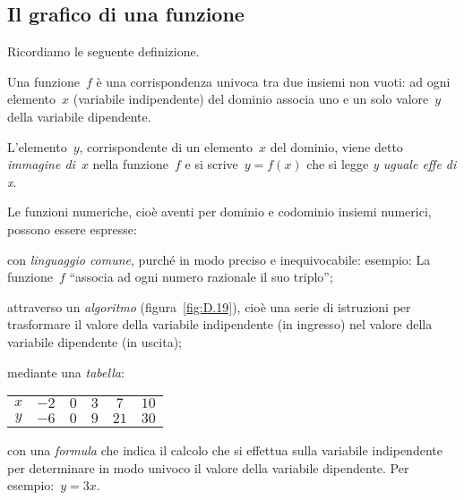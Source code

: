 \begin{comment}
% 
% 
% 
% 


\end{comment}

\subsection{Il grafico di una funzione}
\label{subsec:fun_grafico}

Ricordiamo le seguente definizione.
\begin{definizione}
 Una funzione~\(f\) è una corrispondenza univoca tra due insiemi non vuoti: ad 
ogni elemento~\(x\) (variabile indipendente)
del dominio associa uno e un solo valore~\(y\) della variabile dipendente.

 L'elemento~\(y\), corrispondente di un elemento~\(x\) del dominio, viene detto 
\emph{immagine di}~\(x\) nella funzione~\(f\) e si scrive~\(y=f(x)\) che si legge 
\emph{y uguale effe di x}.
\end{definizione}
Le funzioni numeriche, cioè aventi per dominio e codominio insiemi numerici, 
possono essere espresse:
\begin{itemize*}
\item con \emph{linguaggio comune}, purché in modo preciso e inequivocabile: 
esempio: La funzione~\(f\)
 ``associa ad ogni numero razionale il suo triplo'';
\item attraverso un \emph{algoritmo} (figura~\ref{fig:D.19}), cioè una serie di 
istruzioni per trasformare il valore della variabile indipendente
 (in ingresso) nel valore della variabile dipendente (in uscita);
\item mediante una \emph{tabella}:
 \begin{center}
\begin{tabular}{cccccc}
 \toprule
 \(x\) & \(-2\) & \(0\) & \(3\) & \(7\) & \(10\) \\
 \(y\) & \(-6\) & \(0\) & \(9\) & \(21\) & \(30\)\\
 \bottomrule
 \end{tabular}
 \end{center}
\item con una \emph{formula} che indica il calcolo che si effettua sulla 
variabile indipendente per determinare in modo univoco
il valore della variabile dipendente. Per esempio:~\(y=3x\).
\end{itemize*}

